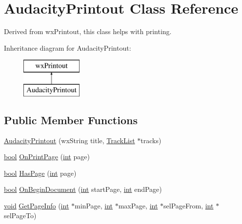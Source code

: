 \hypertarget{class_audacity_printout}{}\section{Audacity\+Printout Class Reference}
\label{class_audacity_printout}


Derived from wx\+Printout, this class helps with printing.  


Inheritance diagram for Audacity\+Printout\+:\begin{figure}[H]
\begin{center}
\leavevmode
\includegraphics[height=2.000000cm]{class_audacity_printout}
\end{center}
\end{figure}
\subsection*{Public Member Functions}
\begin{DoxyCompactItemize}
\item 
\hyperlink{class_audacity_printout_a7c9a098e58b90ba15a9b0aa41f74bf0c}{Audacity\+Printout} (wx\+String title, \hyperlink{class_track_list}{Track\+List} $\ast$tracks)
\item 
\hyperlink{mac_2config_2i386_2lib-src_2libsoxr_2soxr-config_8h_abb452686968e48b67397da5f97445f5b}{bool} \hyperlink{class_audacity_printout_a16c1f54dd03e3d18b876e941dcdc42a9}{On\+Print\+Page} (\hyperlink{xmltok_8h_a5a0d4a5641ce434f1d23533f2b2e6653}{int} page)
\item 
\hyperlink{mac_2config_2i386_2lib-src_2libsoxr_2soxr-config_8h_abb452686968e48b67397da5f97445f5b}{bool} \hyperlink{class_audacity_printout_a415115423675c9898c76262c93ea58d6}{Has\+Page} (\hyperlink{xmltok_8h_a5a0d4a5641ce434f1d23533f2b2e6653}{int} page)
\item 
\hyperlink{mac_2config_2i386_2lib-src_2libsoxr_2soxr-config_8h_abb452686968e48b67397da5f97445f5b}{bool} \hyperlink{class_audacity_printout_a5363091e2664424b26e711d11b0219ac}{On\+Begin\+Document} (\hyperlink{xmltok_8h_a5a0d4a5641ce434f1d23533f2b2e6653}{int} start\+Page, \hyperlink{xmltok_8h_a5a0d4a5641ce434f1d23533f2b2e6653}{int} end\+Page)
\item 
\hyperlink{sound_8c_ae35f5844602719cf66324f4de2a658b3}{void} \hyperlink{class_audacity_printout_a38254b59147f0274a83d9106219cd5f4}{Get\+Page\+Info} (\hyperlink{xmltok_8h_a5a0d4a5641ce434f1d23533f2b2e6653}{int} $\ast$min\+Page, \hyperlink{xmltok_8h_a5a0d4a5641ce434f1d23533f2b2e6653}{int} $\ast$max\+Page, \hyperlink{xmltok_8h_a5a0d4a5641ce434f1d23533f2b2e6653}{int} $\ast$sel\+Page\+From, \hyperlink{xmltok_8h_a5a0d4a5641ce434f1d23533f2b2e6653}{int} $\ast$sel\+Page\+To)
\end{DoxyCompactItemize}


